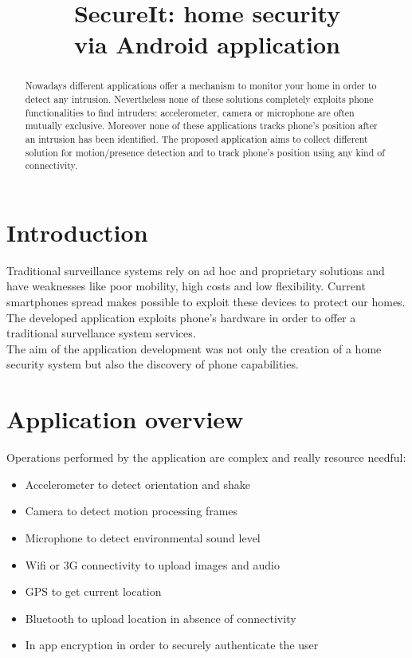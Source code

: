 \documentclass[conference, 11pt]{IEEEtran}
\begin{document}
\title{SecureIt: home security\\
via Android application}

\author{
}


\maketitle


\begin{abstract}
Nowadays different applications offer a mechanism to monitor your home in order to detect any intrusion. Nevertheless none of these solutions completely exploits phone functionalities to find intruders: accelerometer, camera or microphone are often mutually exclusive. Moreover none of these applications tracks phone's position after an intrusion has been identified. The proposed application aims to collect different solution for motion/presence detection and to track phone's position using any kind of connectivity.
\end{abstract}

\IEEEpeerreviewmaketitle

\section{\textbf{Introduction}}
Traditional surveillance systems rely on ad hoc and proprietary solutions and have weaknesses like poor mobility, high costs and low flexibility. Current smartphones spread makes possible to exploit these devices to protect our homes.\\

The developed application exploits phone's hardware in order to offer a traditional survellance system services.\\

The aim of the application development was not only the creation of a home security system but also the discovery of phone capabilities. 

\section{\textbf{Application overview}}
Operations performed by the application are complex and really resource needful:
\begin{itemize}
	\item Accelerometer to detect orientation and shake
	\item Camera to detect motion processing frames
	\item Microphone to detect environmental sound level
	\item Wifi or 3G connectivity to upload images and audio
	\item GPS to get current location
	\item Bluetooth to upload location in absence of connectivity
	\item In app encryption in order to securely authenticate the user
\end{itemize}
\end{document}
